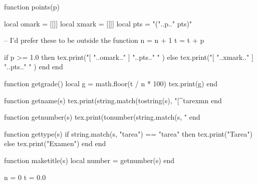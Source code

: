 \usepackage[a4paper, top=2cm]{geometry}
\usepackage{pifont}
\usepackage{xfp}
\usepackage[dvipsnames]{xcolor}
\usepackage{titlesec}
\usepackage[most]{tcolorbox}
\usepackage{csvsimple}
\usepackage{luacode}



\begin{luacode*}

    function points(p)

        local omark = [[{\color{OliveGreen}}]]
        local xmark = [[{\color{Bittersweet}}]]
        local pts = "("..p.." pts)"

        -- I'd prefer these to be outside the function
        n = n + 1
        t = t + p

        if p >= 1.0 then
            tex.print("[ "..omark.." ] "..pts.." " )
        else
            tex.print("[ "..xmark.." ] "..pts.." " )
        end
    end

    function getgrade()
        local g = math.floor(t / n * 100)
        tex.print(g)
    end

    function getname(s)
        tex.print(string.match(tostring(s), "[^tarexmn%
    end

    function getnumber(s)
        tex.print(tonumber(string.match(s, "%
    end

    function gettype(s)
        if string.match(s, "tarea") == "tarea" then
            tex.print("Tarea")
        else
            tex.print("Examen")
        end
    end

    function maketitle(s)
        local number = getnumber(s)
    end

    n = 0
    t = 0.0

\end{luacode*}


\newcommand{\point}[1]{\item\textbf{\directlua{points(#1)}}}

\newcommand{\gettitle}{
    \directlua{
        gettype(\luastring\jobname)
        getnumber(\luastring\jobname)
    }
    de Heurística 
}

\newcommand{\getauthor}{
    \csvreader[no head, filter equal={\csvcolii}{\directlua{getname(\luastring\jobname)}}]{./students-list.csv}{}{\csvcoli}
}

\newcommand{\getgrade}{\directlua{getgrade()} de 100}

\newcommand{\prettyauthor}[1]{\flushright{\textit{--- #1}}}
